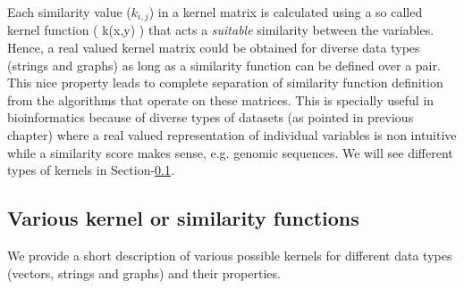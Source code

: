 Each similarity value ($k_{i,j}$) in a kernel matrix is calculated using a so called kernel function ( k(x,y) ) that acts a \textit{suitable} similarity between the variables. Hence, a real valued kernel matrix could be obtained for diverse data types (strings and graphs) as long as a similarity function can be defined over a pair. This nice property leads to complete separation of similarity function definition from the algorithms that operate on these matrices. This is specially useful in bioinformatics because of diverse types of datasets (as pointed in previous chapter) where a real valued representation of individual variables is non intuitive while a similarity score makes sense, e.g. genomic sequences. We will see different types of kernels in Section-\ref{kern_types}. 

\subsection{Various kernel or similarity functions}\label{kern_types}
We provide a short description of various possible kernels for different data types (vectors, strings and graphs) and their properties.

